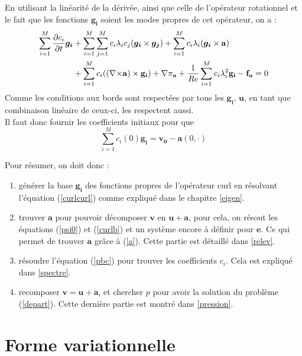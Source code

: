 En utilisant la linéarité de la dérivée, ainsi que celle de l'opérateur rotationnel et le fait que les fonctions $\bm{g_i}$ soient les modes propres de cet opérateur, on a :
\begin{equation}\label{pbc}
\begin{aligned}
\sum_{i=1}^M\frac{\partial c_i}{\partial t}\bm{g_i} &+ \sum_{i=1}^M\sum_{j=1}^Mc_i\lambda_ic_j(\bm{g_i}\times \bm{g_j}) + \sum_{i=1}^Mc_i\lambda_i(\bm{g_i}\times \mathbf{a})\\
& +  \sum_{i=1}^Mc_i(({\nabla\times}\mathbf{a})\times \mathbf{g_i}) + {\nabla} \pi_{\mathbf{a}} +\frac{1}{Re}\sum_{i=1}^Mc_i\lambda_i^2\mathbf{g_i} - \mathbf{f_a} = 0\\
\end{aligned}\end{equation}
Comme les conditions aux bords sont respectées par tous les $\bm{g_i}$, $\bm{u}$, en tant que combinaison linéaire de ceux-ci, les respectent aussi.\\
Il faut donc fournir les coefficients initiaux pour que 
\[ \sum_{i=1}^M c_i(0)\bm{g_i} = \bm{v_0}-\bm{a}(0,\cdot) \]

Pour résumer, on doit donc :
\begin{enumerate}
\item générer la base $\mathbf{g_i}$ des fonctions propres de l'opérateur curl en résolvant l'équation (\ref{curlcurl}) comme expliqué dans le chapitre \ref{eigen}.
\item trouver $\mathbf{a}$ pour pouvoir décomposer $\mathbf{v}$ en $\mathbf{u}+\mathbf{a}$, pour cela, on résout les équations (\ref{psi0}) et (\ref{curlb}) et un système encore à définir pour $\bm{e}$. Ce qui permet de trouver $\mathbf{a}$ grâce à (\ref{a}). Cette partie est détaillé dans \ref{relev}.
\item résoudre l'équation (\ref{pbc}) pour trouver les coefficients $c_i$. Cela est expliqué dans \ref{spectre}.
\item recomposer $\mathbf{v}=\mathbf{u}+\mathbf{a}$, et chercher $p$ pour avoir la solution du problème (\ref{depart}). Cette dernière partie est montré dans \ref{pression}.
\end{enumerate}

\chapter{Forme variationnelle}
\label{fv}
